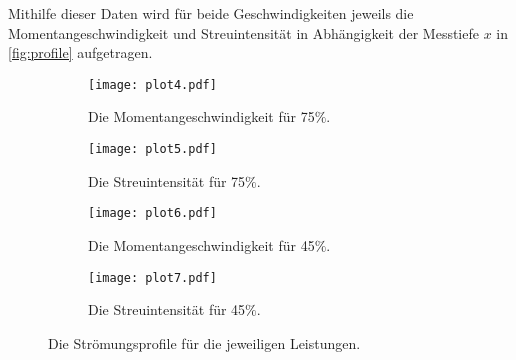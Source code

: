 Mithilfe dieser Daten wird für beide Geschwindigkeiten jeweils die Momentangeschwindigkeit und Streuintensität
in Abhängigkeit der Messtiefe $x$ in \autoref{fig:profile} aufgetragen.
\begin{figure}[H]
  \centering
  
  \begin{subfigure}{0.49\columnwidth}
  \centering
  \texttt{[image: plot4.pdf]}
  \caption{Die Momentangeschwindigkeit für 75$\%$.}
  \label{fig:p4}
  \end{subfigure}\hfill
  \begin{subfigure}{0.49\columnwidth}
  \centering
  \texttt{[image: plot5.pdf]}
  \caption{Die Streuintensität für 75$\%$.}
  \label{fig:p5}
  \end{subfigure}
  
  \medskip
  
  \begin{subfigure}{0.49\columnwidth}
  \centering
  \texttt{[image: plot6.pdf]}
  \caption{Die Momentangeschwindigkeit für 45$\%$.}
  \label{fig:p6}
  \end{subfigure}\hfill
  \begin{subfigure}{0.49\columnwidth}
  \centering
  \texttt{[image: plot7.pdf]}
  \caption{Die Streuintensität für 45$\%$.}
  \label{fig:p7}
  \end{subfigure}

  \caption{Die Strömungsprofile für die jeweiligen Leistungen.}
  \label{fig:profile}
\end{figure}


